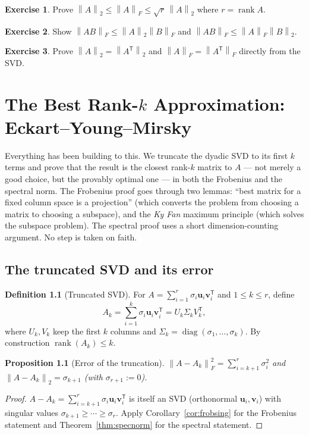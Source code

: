 \documentclass[11pt,oneside]{book}
\theoremstyle{plain}
\newtheorem{proposition}[theorem]{Proposition}
\theoremstyle{definition}
\newtheorem{definition}[theorem]{Definition}
\newtheorem{exercise}{Exercise}[chapter]
\theoremstyle{remark}
\newcommand{\rank}{\operatorname{rank}}
\newcommand{\norm}[1]{\left\lVert #1 \right\rVert}
\newcommand{\fn}[1]{\norm{#1}_F}
\newcommand{\sn}[1]{\norm{#1}_2}
\newcommand{\T}{^{\mathsf T}}
\newcommand{\bu}{\mathbf{u}}
\newcommand{\bv}{\mathbf{v}}
\begin{document}
\begin{exercise}
Prove $\sn{A}\le\fn{A}\le\sqrt{r}\,\sn{A}$ where $r=\rank A$.
\end{exercise}
\begin{exercise}
Show $\fn{AB}\le\sn{A}\fn{B}$ and $\fn{AB}\le\fn{A}\sn{B}$.
\end{exercise}
\begin{exercise}
Prove $\sn{A}=\sn{A\T}$ and $\fn{A}=\fn{A\T}$ directly from the SVD.
\end{exercise}

\chapter{The Best Rank-$k$ Approximation: Eckart--Young--Mirsky}\label{ch:ey}

\begin{intuition_box}
Everything has been building to this. We truncate the dyadic SVD to its first $k$ terms
and prove that the result is the closest rank-$k$ matrix to $A$ --- not merely a good
choice, but the provably optimal one --- in both the Frobenius and the spectral norm. The
Frobenius proof goes through two lemmas: ``best matrix for a fixed column space is a
projection'' (which converts the problem from choosing a matrix to choosing a subspace),
and the \emph{Ky Fan} maximum principle (which solves the subspace problem). The spectral
proof uses a short dimension-counting argument. No step is taken on faith.
\end{intuition_box}

\section{The truncated SVD and its error}

\begin{definition}[Truncated SVD]
For $A=\sum_{i=1}^r\sigma_i\bu_i\bv_i\T$ and $1\le k\le r$, define
\[
A_k=\sum_{i=1}^k\sigma_i\bu_i\bv_i\T=U_k\Sigma_k V_k\T,
\]
where $U_k,V_k$ keep the first $k$ columns and $\Sigma_k=\operatorname{diag}
(\sigma_1,\dots,\sigma_k)$. By construction $\rank(A_k)\le k$.
\end{definition}

\begin{proposition}[Error of the truncation]\label{prop:truncerr}
$\displaystyle \fn{A-A_k}^2=\sum_{i=k+1}^{r}\sigma_i^2$ and
$\sn{A-A_k}=\sigma_{k+1}$ (with $\sigma_{r+1}:=0$).
\end{proposition}
\begin{proof}
$A-A_k=\sum_{i=k+1}^r\sigma_i\bu_i\bv_i\T$ is itself an SVD (orthonormal $\bu_i,\bv_i$)
with singular values $\sigma_{k+1}\ge\cdots\ge\sigma_r$. Apply
Corollary~\ref{cor:frobsing} for the Frobenius statement and
Theorem~\ref{thm:specnorm} for the spectral statement.
\end{proof}
\end{document}
